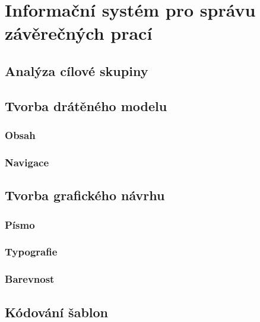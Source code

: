 \chapter{Informační systém pro správu závěrečných prací}

\section{Analýza cílové skupiny}

\section{Tvorba drátěného modelu}
\subsection{Obsah}
\subsection{Navigace}

\section{Tvorba grafického návrhu}
\subsection{Písmo}
\subsection{Typografie}
\subsection{Barevnost}

\section{Kódování šablon}
